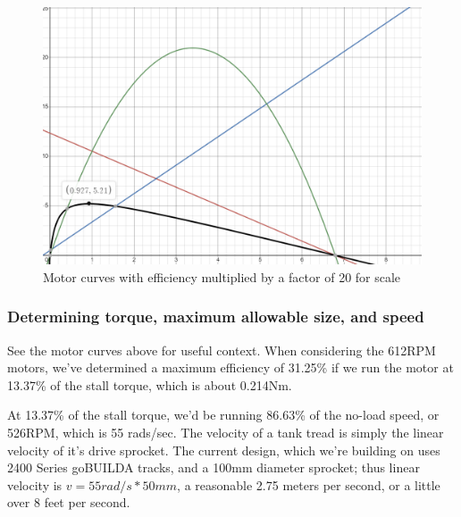 \documentclass[a4paper, 10pt]{article}
\begin{document}
		\begin{figure} [!h]
			\centering
			\includegraphics[scale=0.5]{Photos/motor_curves_118}
			\caption{Motor curves with efficiency multiplied by a factor of 20 for scale}
			\label{motor_curves_118}
		\end{figure}

		\subsubsection*{Determining torque, maximum allowable size, and speed}
		See the motor curves above for useful context. When considering the 612RPM motors, we've determined a maximum efficiency of 31.25\% if we run the motor at 13.37\% of the stall torque, which is about 0.214Nm. 
		
		At 13.37\% of the stall torque, we'd be running 86.63\% of the no-load speed, or 526RPM, which is 55 rads/sec. The velocity of a tank tread is simply the linear velocity of it's drive sprocket. The current design, which we're building on uses 2400 Series goBUILDA tracks, and a 100mm diameter sprocket; thus linear velocity is $v = 55rad/s * 50mm$, a reasonable 2.75 meters per second, or a little over 8 feet per second. 
		
\end{document}
